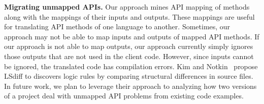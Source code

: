 \textbf{Migrating unmapped APIs.} Our approach mines API mapping of
methods along with the mappings of their inputs and outputs. These
mappings are useful for translating API methods of one language to
another. Sometimes, our approach may not be able to map inputs and
outputs of mapped API methods. If our approach is not able to map
outputs, our approach currently simply ignores those outputs that are not used
in the client code. However, since inputs cannot be ignored, the
translated code has compilation errors. Kim and Notkin~\cite{kim2009discovering} propose LSdiff to discovers logic rules by comparing structural differences in source files. 
In future work, we plan to leverage their approach to analyzing how two versions of a
project deal with unmapped API problems from existing code
examples.
